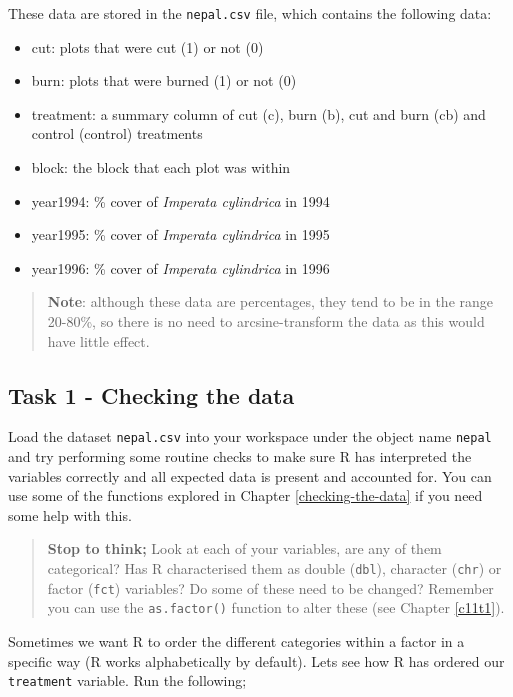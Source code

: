 \documentclass[
]{book}
\providecommand{\tightlist}{%
  \setlength{\itemsep}{0pt}\setlength{\parskip}{0pt}}
\begin{document}
These data are stored in the \texttt{nepal.csv} file, which contains the following data:

\begin{itemize}
\tightlist
\item
  cut: plots that were cut (1) or not (0)
\item
  burn: plots that were burned (1) or not (0)
\item
  treatment: a summary column of cut (c), burn (b), cut and burn (cb) and control (control) treatments
\item
  block: the block that each plot was within
\item
  year1994: \% cover of \emph{Imperata cylindrica} in 1994
\item
  year1995: \% cover of \emph{Imperata cylindrica} in 1995
\item
  year1996: \% cover of \emph{Imperata cylindrica} in 1996
\end{itemize}

\begin{quote}
\textbf{Note}: although these data are percentages, they tend to be in the range 20-80\%, so there is no need to arcsine-transform the data as this would have little effect.
\end{quote}

\subsection{Task 1 - Checking the data}\label{task-1---checking-the-data-2}

Load the dataset \texttt{nepal.csv} into your workspace under the object name \texttt{nepal} and try performing some routine checks to make sure R has interpreted the variables correctly and all expected data is present and accounted for. You can use some of the functions explored in Chapter \ref{checking-the-data} if you need some help with this.

\begin{quote}
\textbf{Stop to think;}
Look at each of your variables, are any of them categorical? Has R characterised them as double (\texttt{dbl}), character (\texttt{chr}) or factor (\texttt{fct}) variables?
Do some of these need to be changed? Remember you can use the \texttt{as.factor()} function to alter these (see Chapter \ref{c11t1}).
\end{quote}

Sometimes we want R to order the different categories within a factor in a specific way (R works alphabetically by default). Lets see how R has ordered our \texttt{treatment} variable. Run the following;
\end{document}
